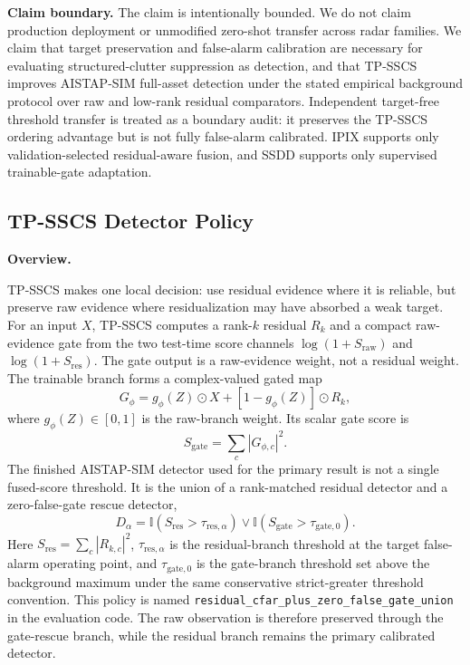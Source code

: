\documentclass[journal]{IEEEtran}
\begin{document}
\noindent\textbf{Claim boundary.} The claim is intentionally bounded. We do not claim production deployment or unmodified zero-shot transfer across radar families. We claim that target preservation and false-alarm calibration are necessary for evaluating structured-clutter suppression as detection, and that TP-SSCS improves AISTAP-SIM full-asset detection under the stated empirical background protocol over raw and low-rank residual comparators. Independent target-free threshold transfer is treated as a boundary audit: it preserves the TP-SSCS ordering advantage but is not fully false-alarm calibrated. IPIX supports only validation-selected residual-aware fusion, and SSDD supports only supervised trainable-gate adaptation.

\subsection{TP-SSCS Detector Policy}

\noindent\textbf{Overview.}

TP-SSCS makes one local decision: use residual evidence where it is reliable, but preserve raw evidence where residualization may have absorbed a weak target. For an input $X$, TP-SSCS computes a rank-$k$ residual $R_k$ and a compact raw-evidence gate from the two test-time score channels $\log(1+S_{\mathrm{raw}})$ and $\log(1+S_{\mathrm{res}})$. The gate output is a raw-evidence weight, not a residual weight. The trainable branch forms a complex-valued gated map
\begin{equation}
    G_\phi =
    g_\phi(Z)\odot X + [1-g_\phi(Z)]\odot R_k ,
\end{equation}
where $g_\phi(Z)\in[0,1]$ is the raw-branch weight. Its scalar gate score is
\begin{equation}
    S_{\mathrm{gate}} = \sum_c |G_{\phi,c}|^2 .
\end{equation}
The finished AISTAP-SIM detector used for the primary result is not a single fused-score threshold. It is the union of a rank-matched residual detector and a zero-false-gate rescue detector,
\begin{equation}
    D_\alpha =
    \mathbb I(S_{\mathrm{res}}>\tau_{\mathrm{res},\alpha})
    \lor
    \mathbb I(S_{\mathrm{gate}}>\tau_{\mathrm{gate},0}) .
\end{equation}
Here $S_{\mathrm{res}}=\sum_c|R_{k,c}|^2$, $\tau_{\mathrm{res},\alpha}$ is the residual-branch threshold at the target false-alarm operating point, and $\tau_{\mathrm{gate},0}$ is the gate-branch threshold set above the background maximum under the same conservative strict-greater threshold convention. This policy is named \texttt{residual\_cfar\_plus\_zero\_false\_gate\_union} in the evaluation code. The raw observation is therefore preserved through the gate-rescue branch, while the residual branch remains the primary calibrated detector.
\end{document}
